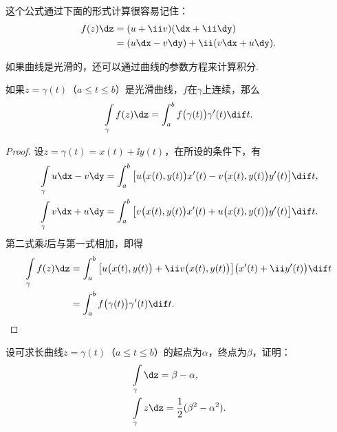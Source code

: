 这个公式通过下面的形式计算很容易记住：
\begin{align*}
f(z)\dz & = (u+\ii v)(\dx+\ii\dy) \\
        & = (u\dx-v\dy)+\ii(v\dx+u\dy).
\end{align*}

如果曲线是光滑的，还可以通过曲线的参数方程来计算积分.
\begin{prop}\label{prop3.1.2}
如果$z=\gamma(t)$（$a\le t\le b$）是光滑曲线，$f$在$\gamma$上连续，那么
\begin{equation}\label{eq3.1.3}
  \int\limits_\gamma f(z)\dz = \int_a^b f\big(\gamma(t)\big)\gamma'(t)\dif t.
\end{equation}
\end{prop}
\begin{proof}
设$z=\gamma(t)=x(t)+\ii y(t)$，在所设的条件下，有
\begin{align*}
  &\int\limits_\gamma u\dx-v\dy = \int_a^b\big[u\big(x(t),y(t)\big)x'(t)-v\big(x(t),y(t)\big)y'(t)\big]\dif t,\\
  &\int\limits_\gamma v\dx+u\dy = \int_a^b\big[v\big(x(t),y(t)\big)x'(t)+u\big(x(t),y(t)\big)y'(t)\big]\dif t.
\end{align*}
第二式乘$\ii$后与第一式相加，即得
\begin{align*}
  \int\limits_\gamma f(z)\dz
  & = \int_a^b \big[u\big(x(t),y(t)\big)+\ii v\big(x(t),y(t)\big)\big]\big(x'(t)+\ii y'(t)\big)\dif t\\
  & = \int_a^b f\big(\gamma(t)\big)\gamma'(t)\dif t. \qedhere
\end{align*}
\end{proof}
\begin{example}\label{exam3.1.3}
  设可求长曲线$z=\gamma(t)$（$a\le t\le b$）的起点为$\alpha$，终点为$\beta$，证明：
  \begin{align*}
    &\int\limits_\gamma\dz=\beta-\alpha,\\
    &\int\limits_\gamma z\dz=\frac12(\beta^2-\alpha^2).
  \end{align*}
\end{example}
